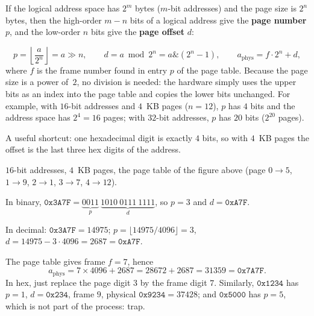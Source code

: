 \documentclass[11pt,a4paper]{article}
\newcommand{\term}[1]{\textbf{\color{mintdeep}#1}}
\begin{document}
If the logical address space has $2^{m}$ bytes ($m$-bit addresses) and the page size is $2^{n}$ bytes, then the high-order $m-n$ bits of a logical address give the \term{page number} $p$, and the low-order $n$ bits give the \term{page offset} $d$:
\begin{center}
\end{center}
\[
p = \left\lfloor \frac{a}{2^{n}} \right\rfloor = a \gg n, \qquad
d = a \bmod 2^{n} = a \mathbin{\&} (2^{n}-1), \qquad
a_{\text{phys}} = f \cdot 2^{n} + d,
\]
where $f$ is the frame number found in entry $p$ of the page table. Because the page size is a power of~$2$, no division is needed: the hardware simply uses the upper bits as an index into the page table and copies the lower bits unchanged. For example, with $16$-bit addresses and $4$~KB pages ($n=12$), $p$ has $4$ bits and the address space has $2^{4}=16$ pages; with $32$-bit addresses, $p$ has $20$ bits ($2^{20}$ pages).

A useful shortcut: one hexadecimal digit is exactly $4$ bits, so with $4$~KB pages the offset is the last three hex digits of the address.

\begin{example}
$16$-bit addresses, $4$~KB pages, the page table of the figure above (page $0\to5$, $1\to9$, $2\to1$, $3\to7$, $4\to12$).

In binary, $\texttt{0x3A7F} = \underbrace{0011}_{p}\ \underbrace{1010\ 0111\ 1111}_{d}$, so $p = 3$ and $d = \texttt{0xA7F}$.

In decimal: $\texttt{0x3A7F} = 14975$; $p = \lfloor 14975/4096 \rfloor = 3$, $d = 14975 - 3\cdot4096 = 2687 = \texttt{0xA7F}$.

The page table gives frame $f = 7$, hence
\[
a_{\text{phys}} = 7 \times 4096 + 2687 = 28672 + 2687 = 31359 = \texttt{0x7A7F}.
\]
In hex, just replace the page digit $3$ by the frame digit $7$. Similarly, $\texttt{0x1234}$ has $p=1$, $d=\texttt{0x234}$, frame $9$, physical $\texttt{0x9234} = 37428$; and $\texttt{0x5000}$ has $p = 5$, which is not part of the process: trap.
\end{example}
\end{document}

